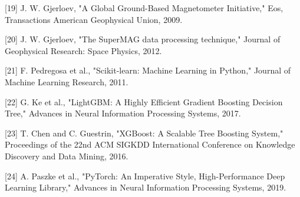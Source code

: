 \documentclass[conference]{IEEEtran}
\begin{document}
[19] J. W. Gjerloev, "A Global Ground-Based Magnetometer Initiative," Eos, Transactions American Geophysical Union, 2009.

[20] J. W. Gjerloev, "The SuperMAG data processing technique," Journal of Geophysical Research: Space Physics, 2012.

[21] F. Pedregosa et al., "Scikit-learn: Machine Learning in Python," Journal of Machine Learning Research, 2011.

[22] G. Ke et al., "LightGBM: A Highly Efficient Gradient Boosting Decision Tree," Advances in Neural Information Processing Systems, 2017.

[23] T. Chen and C. Guestrin, "XGBoost: A Scalable Tree Boosting System," Proceedings of the 22nd ACM SIGKDD International Conference on Knowledge Discovery and Data Mining, 2016.

[24] A. Paszke et al., "PyTorch: An Imperative Style, High-Performance Deep Learning Library," Advances in Neural Information Processing Systems, 2019.
\end{document}
